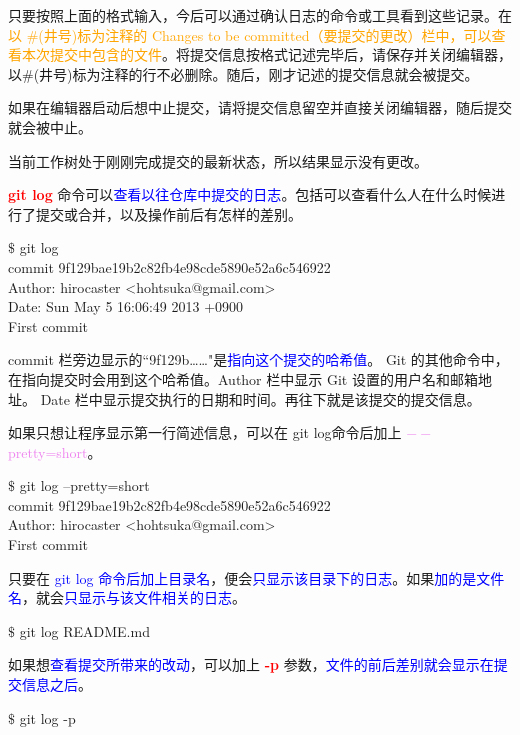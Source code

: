 \documentclass[12pt,a4paper]{article}
\begin{document}
只要按照上面的格式输入，今后可以通过确认日志的命令或工具看到这些记录。在\textcolor{orange}{以 $\#$(井号)标为注释的 Changes to be committed（要提交的更改）栏中，可以查看本次提交中包含的文件}。将提交信息按格式记述完毕后，请保存并关闭编辑器，以$\#$(井号)标为注释的行不必删除。随后，刚才记述的提交信息就会被提交。

如果在编辑器启动后想中止提交，请将提交信息留空并直接关闭编辑器，随后提交就会被中止。

当前工作树处于刚刚完成提交的最新状态，所以结果显示没有更改。

\textcolor{red}{\bf git log} 命令可以\textcolor{blue}{查看以往仓库中提交的日志}。包括可以查看什么人在什么时候进行了提交或合并，以及操作前后有怎样的差别。
\begin{tcolorbox}[colback=green!5,colframe=green!40!black,title= ]
$\$$ git log \\
commit 9f129bae19b2c82fb4e98cde5890e52a6c546922 \\
Author: hirocaster <hohtsuka@gmail.com> \\
Date: Sun May 5 16:06:49 2013 +0900 \\
First commit 
\end{tcolorbox}
commit 栏旁边显示的``9f129b……"是\textcolor{blue}{指向这个提交的哈希值}。 Git 的其他命令中，在指向提交时会用到这个哈希值。Author 栏中显示 Git 设置的用户名和邮箱地址。 Date 栏中显示提交执行的日期和时间。再往下就是该提交的提交信息。

如果只想让程序显示第一行简述信息，可以在 git log命令后加上 \textcolor{violet}{$--$pretty=short}。
\begin{tcolorbox}[colback=green!5,colframe=green!40!black,title= ]
$\$$ git log --pretty=short \\
commit 9f129bae19b2c82fb4e98cde5890e52a6c546922 \\
Author: hirocaster <hohtsuka@gmail.com> \\
First commit
\end{tcolorbox}
只要在 \textcolor{blue}{git log 命令后加上目录名}，便会\textcolor{blue}{只显示该目录下的日志}。如果\textcolor{blue}{加的是文件名}，就会\textcolor{blue}{只显示与该文件相关的日志}。
\begin{tcolorbox}[colback=green!5,colframe=green!40!black,title= ]
$\$$ git log README.md
\end{tcolorbox}

如果想\textcolor{blue}{查看提交所带来的改动}，可以加上 \textcolor{red}{\bf -p} 参数，\textcolor{blue}{文件的前后差别就会显示在提交信息之后}。
\begin{tcolorbox}[colback=green!5,colframe=green!40!black,title= ]
$\$$ git log -p
\end{tcolorbox}
\end{document}
